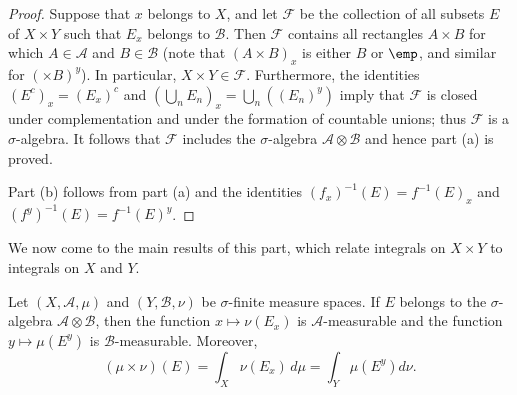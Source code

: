 \begin{proof}
Suppose that $x$ belongs to $X$, and let $\mathcal{F}$ be the collection of all subsets $E$ of $X\times Y$ such that $E_x$ belongs to $\mathcal{B}$. Then $\mathcal{F}$ contains all rectangles $A\times B$ for which $A\in\mathcal{A}$ and $B\in\mathcal{B}$ (note that $(A\times B)_x$ is either $B$ or $\emp$, and similar for $(\times B)^y$). In particular, $X\times Y\in\mathcal{F}$. Furthermore, the identities $(E^c)_x=(E_x)^c$ and $(\bigcup_nE_n)_x=\bigcup_n((E_n)^y)$ imply that $\mathcal{F}$ is closed under complementation and under the formation of countable unions; thus $\mathcal{F}$ is a $\sigma$-algebra. It follows that $\mathcal{F}$ includes the $\sigma$-algebra $\mathcal{A}\otimes\mathcal{B}$ and hence  part (a) is proved.\par
Part (b) follows from part (a) and the identities $(f_x)^{-1}(E)=f^{-1}(E)_x$ and $(f^y)^{-1}(E)=f^{-1}(E)^y$.
\end{proof}
We now come to the main results of this part, which relate integrals on $X\times Y$ to integrals on $X$ and $Y$.
\begin{theorem}\label{product measure int on section}
Let $(X,\mathcal{A},\mu)$ and $(Y,\mathcal{B},\nu)$ be $\sigma$-finite measure spaces. If $E$ belongs to the $\sigma$-algebra $\mathcal{A}\otimes\mathcal{B}$, then the function $x\mapsto\nu(E_x)$ is $\mathcal{A}$-measurable and the function $y\mapsto\mu(E^y)$ is $\mathcal{B}$-measurable. Moreover,
\[(\mu\times\nu)(E)=\int_X\nu(E_x)\,d\mu=\int_Y\mu(E^y)d\nu.\]
\end{theorem}

